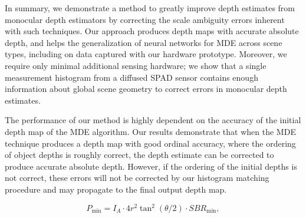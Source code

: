 In summary, we demonstrate a method to greatly improve depth estimates from
monocular depth estimators by correcting the scale ambiguity errors inherent
with such techniques.  Our approach produces depth maps with accurate absolute
depth, and helps the generalization of neural networks for MDE across scene
types, including on data captured with our hardware prototype.  Moreover, we
require only minimal additional sensing hardware; we show that a single measurement
histogram from a diffused SPAD sensor contains enough information about global
scene geometry to correct errors in monocular depth estimates.


The performance of our method is highly dependent on the accuracy of the initial
depth map of the MDE algorithm.
Our results demonstrate that when the MDE technique produces a depth map
with good ordinal accuracy, where the ordering of object depths is roughly correct, the
depth estimate can be corrected to produce accurate absolute depth. However, if
the ordering of the initial depths is not correct, these errors will not be
corrected by our histogram matching procedure and may propagate to the final
output depth map.

 
%
\begin{equation}
  P_{\text{min}} = I_A \cdot 4 r^2 \tan^2(\theta/2) \cdot SBR_{\text{min}},
\end{equation} 

